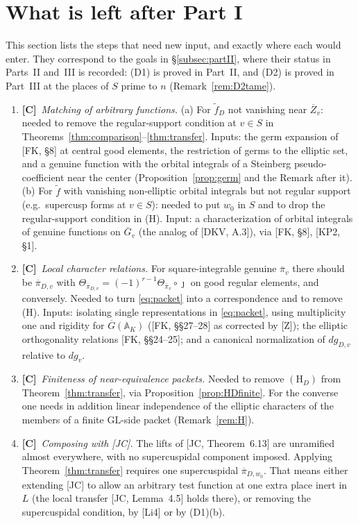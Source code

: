 \documentclass[12pt]{article}
\newcommand{\ov}[1]{\overline{#1}}
\newcommand{\A}{\mathbb{A}}
\newcommand{\GL}{\mathrm{GL}}
\newcommand{\Gb}{\ov{G}}
\newcommand{\Zb}{\ov{Z}}
\newcommand{\pib}{\ov{\pi}}
\newcommand{\jj}{\jmath}
\newcommand{\Cv}{\textbf{[C]}}
\theoremstyle{plain}
\theoremstyle{definition}
\begin{document}
\section{What is left after Part I}\label{sec:deferred}
This section lists the steps that need new input, and exactly where each would enter. They correspond to the goals in \S\ref{subsec:partII}, where their status in Parts~II and~III is recorded: (D1) is proved in Part~II, and (D2) is proved in Part~III at the places of $S$ prime to $n$ (Remark~\ref{rem:D2tame}).

\begin{enumerate}[label=(D\arabic*),leftmargin=3em]
\item \Cv\ \emph{Matching of arbitrary functions.} (a) For $\tilde f_D$ not vanishing near $\Zb_v$: needed to remove the regular-support condition at $v\in S$ in Theorems~\ref{thm:comparison}--\ref{thm:transfer}. Inputs: the germ expansion of [FK, \S8] at central good elements, the restriction of germs to the elliptic set, and a genuine function with the orbital integrals of a Steinberg pseudo-coefficient near the center (Proposition~\ref{prop:germ} and the Remark after it). (b) For $\tilde f$ with vanishing non-elliptic orbital integrals but not regular support (e.g.\ supercusp forms at $v\in S$): needed to put $w_0$ in $S$ and to drop the regular-support condition in (H). Input: a characterization of orbital integrals of genuine functions on $\Gb_v$ (the analog of [DKV, A.3]), via [FK, \S8], [KP2, \S1].
\item \Cv\ \emph{Local character relations.} For square-integrable genuine $\pib_v$ there should be $\pib_{D,v}$ with $\Theta_{\pib_{D,v}}=(-1)^{r-1}\Theta_{\pib_v}\circ\jj$ on good regular elements, and conversely. Needed to turn \eqref{eq:packet} into a correspondence and to remove (H). Inputs: isolating single representations in \eqref{eq:packet}, using multiplicity one and rigidity for $\Gb(\A_K)$ ([FK, \S\S27--28] as corrected by [Z]); the elliptic orthogonality relations [FK, \S\S24--25]; and a canonical normalization of $dg_{D,v}$ relative to $dg_v$.
\item \Cv\ \emph{Finiteness of near-equivalence packets.} Needed to remove $(\mathrm H_D)$ from Theorem~\ref{thm:transfer}, via Proposition~\ref{prop:HDfinite}. For the converse one needs in addition linear independence of the elliptic characters of the members of a finite $\GL$-side packet (Remark~\ref{rem:H}).
\item \Cv\ \emph{Composing with [JC].} The lifts of [JC, Theorem~6.13] are unramified almost everywhere, with no supercuspidal component imposed. Applying Theorem~\ref{thm:transfer} requires one supercuspidal $\pib_{D,w_0}$. That means either extending [JC] to allow an arbitrary test function at one extra place inert in $L$ (the local transfer [JC, Lemma~4.5] holds there), or removing the supercuspidal condition, by [Li4] or by (D1)(b).
\end{enumerate}
\end{document}
